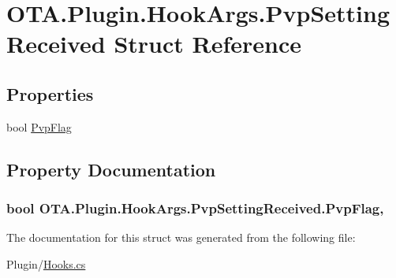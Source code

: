 \hypertarget{struct_o_t_a_1_1_plugin_1_1_hook_args_1_1_pvp_setting_received}{}\section{O\+T\+A.\+Plugin.\+Hook\+Args.\+Pvp\+Setting\+Received Struct Reference}
\label{struct_o_t_a_1_1_plugin_1_1_hook_args_1_1_pvp_setting_received}
\subsection*{Properties}
\begin{DoxyCompactItemize}
\item 
bool \hyperlink{struct_o_t_a_1_1_plugin_1_1_hook_args_1_1_pvp_setting_received_a58ae23a2cbe94c43436044668390585c}{Pvp\+Flag}
\end{DoxyCompactItemize}


\subsection{Property Documentation}
\hypertarget{struct_o_t_a_1_1_plugin_1_1_hook_args_1_1_pvp_setting_received_a58ae23a2cbe94c43436044668390585c}{}
\subsubsection[{Pvp\+Flag}]{\setlength{\rightskip}{0pt plus 5cm}bool O\+T\+A.\+Plugin.\+Hook\+Args.\+Pvp\+Setting\+Received.\+Pvp\+Flag\hspace{0.3cm}{\ttfamily [get]}, {\ttfamily [set]}}\label{struct_o_t_a_1_1_plugin_1_1_hook_args_1_1_pvp_setting_received_a58ae23a2cbe94c43436044668390585c}


The documentation for this struct was generated from the following file\+:\begin{DoxyCompactItemize}
\item 
Plugin/\hyperlink{_hooks_8cs}{Hooks.\+cs}\end{DoxyCompactItemize}
